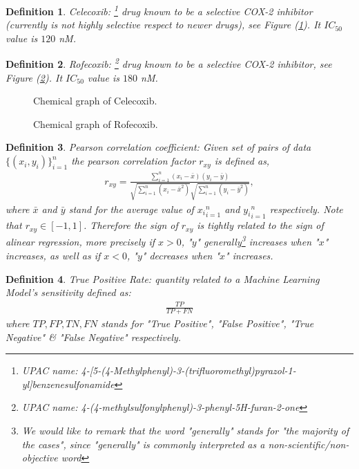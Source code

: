 \documentclass[12pt,letterpaper]{article}
\newtheorem{definition}{Definition}
\begin{document}
\begin{multicols}{2}
\begin{definition}\label{definitionCelecoxib}
Celecoxib: \footnote{UPAC name: 4-[5-(4-Methylphenyl)-3-(trifluoromethyl)pyrazol-1-yl]benzenesulfonamide} drug known to be a selective COX-2 inhibitor (currently is not \emph{highly selective} respect to newer drugs), see Figure (\ref{CelecoxibFigure}). It $IC_{50}$ value is $120$ nM.
\end{definition}

\begin{definition}\label{definitionRofecoxib}
Rofecoxib: \footnote{UPAC name: 4-(4-methylsulfonylphenyl)-3-phenyl-5H-furan-2-one} drug known to be a selective COX-2 inhibitor, see Figure (\ref{RofecoxibFigure}). It $IC_{50}$ value is $180$ nM.
\end{definition}

\begin{figure}[H]
\centering
{}
\caption{Chemical graph of Celecoxib.}
\label{CelecoxibFigure}
\end{figure}

\begin{figure}[H]
\centering
{}
\caption{Chemical graph of Rofecoxib.}
\label{RofecoxibFigure}
\end{figure}
\begin{definition}\label{definitionPersonCoefficient}
Pearson correlation coefficient: Given set of pairs of data $\{(x_i,y_i)\}_{i=1}^n$ the pearson correlation factor $r_{xy}$ is defined as,
\begin{align}
r_{xy}=\frac{\sum_{i=1}^n(x_i-\bar{x})(y_i-\bar{y})}{\sqrt{\sum_{i=1}^n(x_i-\bar{x}^2)}\sqrt{\sum_{i=1}^n(y_i-\bar{y}^2)}},
\end{align}
where $\bar{x}$ and $\bar{y}$ stand for the average value of ${x_i}_{i=1}^n$ and ${y_i}_{i=1}^n$ respectively. Note that $r_{xy}\in[-1,1]$. Therefore the sign of $r_{xy}$ is tightly related to the sign of alinear regression, more precisely if $x>0$, "$y$" generally\footnote{We would like to remark that the word "generally" stands for "the majority of the cases", since "generally" is commonly interpreted as a non-scientific/non-objective word} increases when "$x$" increases, as well as if $x<0$, "$y$" decreases when "$x$" increases.
\end{definition}
\begin{definition}\label{definitionTruePositiveRate}
True Positive Rate: quantity related to a Machine Learning Model's sensitivity defined as:
\begin{align}
\frac{TP}{TP+FN}
\end{align}
where $TP,FP,TN,FN$ stands for "True Positive", "False Positive", "True Negative" \& "False Negative" respectively.
\end{definition}


\end{multicols}
\end{document}

